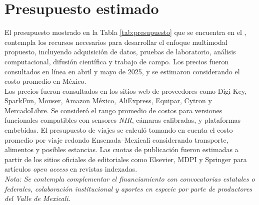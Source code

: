 

\section{Presupuesto estimado}

El presupuesto mostrado en la Tabla \ref{tab:presupuesto} que se encuentra en el , contempla los recursos necesarios para desarrollar el enfoque multimodal propuesto, incluyendo adquisición de datos, pruebas de laboratorio, análisis computacional, difusión científica y trabajo de campo. Los precios fueron consultados en línea en abril y mayo de 2025, y se estimaron considerando el costo promedio en México.\\

Los precios fueron consultados en los sitios web de proveedores como Digi-Key, SparkFun, Mouser, Amazon México, AliExpress, Equipar, Cytron y MercadoLibre. Se consideró el rango promedio de costos para versiones funcionales compatibles con sensores \textit{NIR}, cámaras calibradas, y plataformas embebidas. El presupuesto de viajes se calculó tomando en cuenta el costo promedio por viaje redondo Ensenada–Mexicali considerando transporte, alimentos y posibles estancias. Las cuotas de publicación fueron estimadas a partir de los sitios oficiales de editoriales como Elsevier, MDPI y Springer para artículos \textit{open access} en revistas indexadas.\\

\textit{Nota: Se contempla complementar el financiamiento con convocatorias estatales o federales, colaboración institucional y aportes en especie por parte de productores del Valle de Mexicali.}